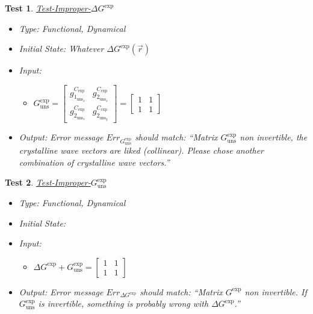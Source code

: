 \documentclass[12pt, titlepage]{article}
\newtheorem{Test}{Test}
\begin{document}
\begin{Test}\normalfont\underline{Test-Improper-$\Delta G^{\text{exp}}$}
\label{T_Bad-G_ref}
\begin{itemize}
\item Type: Functional, Dynamical
\item Initial State: Whatever $\Delta G^{\text{exp}}(\vec{r})$
\item Input:
\begin{itemize}
	\item $G_{\text{uns}}^{\text{exp}} =
	\begin{bmatrix}
	g_{1_{{\text{uns}}_x}}^{C_{\text{exp}}} & g_{2_{{\text{uns}}_x}}^{C_{\text{exp}}} \\
	g_{2_{{\text{uns}}_x}}^{C_{\text{exp}}} & g_{2_{{\text{uns}}_y}}^{C_{\text{exp}}} 
	\end{bmatrix} =\begin{bmatrix}
	1 & 1 \\
	1 & 1 
	\end{bmatrix} $
	\end{itemize} 
\item Output:
Error message $Err_{G_{\text{uns}}^{\text{exp}}}$ should match: \enquote{Matrix $G_{\text{uns}}^{\text{exp}}$ non invertible, the crystalline wave vectors are liked (collinear). Please chose another combination of crystalline wave vectors.}
\end{itemize}
\end{Test}

\begin{Test}\normalfont\underline{Test-Improper-$G_{\text{uns}}^{\text{exp}}$}
\label{T_Bad-Delta-G}
\begin{itemize}
\item Type: Functional, Dynamical
\item Initial State: 
\item Input:
\begin{itemize}
	\item $\Delta G^{\text{exp}}+G_{\text{uns}}^{\text{exp}} =
	\begin{bmatrix}
	1 & 1 \\
	1 & 1 
	\end{bmatrix} $
	\end{itemize} 
\item Output:
Error message $Err_{\Delta G^{\text{exp}}}$ should match: \enquote{Matrix $G^{\text{exp}}$ non invertible. If  $G_{\text{uns}}^{\text{exp}}$ is invertible, something is probably wrong with $\Delta G^{\text{exp}}$.}
\end{itemize}
\end{Test}
					
\end{document}
